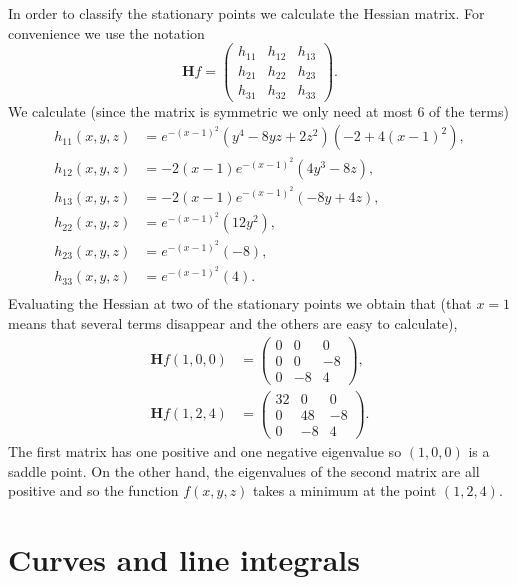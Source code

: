 \begin{solution}
    In order to classify the stationary points we calculate the Hessian matrix.
    For convenience we use the notation
    \[
        \mathbf{H}f =
        \begin{pmatrix}
            h_{11} & h_{12} & h_{13} \\
            h_{21} & h_{22} & h_{23} \\
            h_{31} & h_{32} & h_{33}
        \end{pmatrix}.
    \]
    We calculate (since the matrix is symmetric we only need at most 6 of the terms)
    \[
        \begin{aligned}
            h_{11}(x,y,z)
             & = e^{-{(x-1)}^2} (y^4 - 8yz + 2z^2) (-2 + 4{(x-1)}^2), \\
            h_{12}(x,y,z)
             & = -2(x-1) e^{-{(x-1)}^2} (4y^3 - 8z),                  \\
            h_{13}(x,y,z)
             & = -2(x-1) e^{-{(x-1)}^2} (-8y+4z),                     \\
            h_{22}(x,y,z)
             & = e^{-{(x-1)}^2}(12y^2),                               \\
            h_{23}(x,y,z)
             & = e^{-{(x-1)}^2}(-8),                                  \\
            h_{33}(x,y,z)
             & = e^{-{(x-1)}^2} (4).                                  \\
        \end{aligned}
    \]
    Evaluating the Hessian at two of the stationary points we obtain that (that \(x=1\) means that several terms disappear and the others are easy to calculate),
    \[
        \begin{aligned}
            \mathbf{H}f(1,0,0) & =
            \begin{pmatrix}
                0 & 0  & 0  \\
                0 & 0  & -8 \\
                0 & -8 & 4
            \end{pmatrix}, \\
            \mathbf{H}f(1,2,4) & =
            \begin{pmatrix}
                32 & 0  & 0  \\
                0  & 48 & -8 \\
                0  & -8 & 4
            \end{pmatrix}.
        \end{aligned}
    \]
    The first matrix has one positive and one negative eigenvalue so \((1,0,0)\) is a saddle point.
    On the other hand, the eigenvalues of the second matrix are all positive and so the function \(f(x,y,z)\) takes a minimum at the point \((1,2,4)\).
\end{solution}


\section{Curves and line integrals}